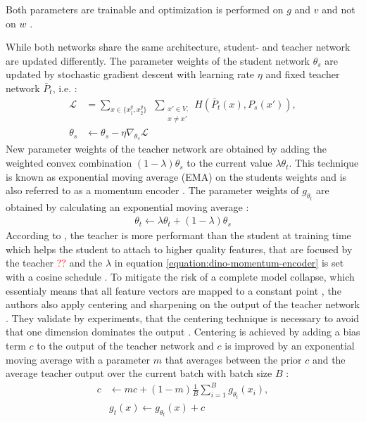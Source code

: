 Both parameters are trainable and optimization is performed on $g$ and $v$ and not on $w$ \citep{Salimans2016}.
\par
While both networks share the same architecture, student- and teacher network are updated differently. 
The parameter weights of the student network $\theta_s$ are updated by stochastic gradient descent with learning rate $\eta$ and fixed teacher network $\bar{P}_t$, i.e. \citep{Caron2021}:
\begin{align}
	\mathcal{L} &= \sum_{x \in \{x_1^g, x_2^g\}} \hspace{5pt} \sum_{\substack{ x\prime \in V, \\ x\neq x\prime}} H(\bar P_t(x),P_s(x\prime)), \\ 
	\theta_s &\leftarrow \theta_s - \eta \nabla_{\theta_s} \mathcal{L}
\end{align}
New parameter weights of the teacher network are obtained by adding the weighted convex combination $(1-\lambda)\theta_s$ to the current value $\lambda\theta_t$.
This technique is known as exponential moving average (EMA) on the students weights and is also referred to as a momentum encoder \citep{He2019,Caron2021}.
The parameter weights of $g_{\theta_t}$ are obtained by calculating an exponential moving average \citep{Grill2020,Caron2021}: 
\begin{align}
	\theta_t \leftarrow \lambda \theta_t + (1-\lambda) \theta_s
	\label{equation:dino-momentum-encoder}
\end{align}
According to \citep{Caron2021}, the teacher is more performant than the student at training time which helps the student to attach to higher quality features, that are focused by the teacher \textcolor{red}{??} and the $\lambda$ in equation \ref{equation:dino-momentum-encoder} is set with a cosine schedule \citep{Grill2020}.
To mitigate the risk of a complete model collapse, which essentialy means that all feature vectors are mapped to a constant point \citep{Jing2022}, the authors also apply centering and sharpening on the output of the teacher network \citep{Caron2021}.
They validate by experiments, that the centering technique is necessary to avoid that one dimension dominates the output \citep{Caron2021}.
Centering is achieved by adding a bias term $c$ to the output of the teacher network and $c$ is improved by an exponential moving average with a parameter $m$ that averages between the prior $c$ and the average teacher output over the current batch with batch size $B$ \citep{Caron2021}:
\begin{align}
	c & \leftarrow mc + (1-m) \frac{1}{B}\sum_{i=1}^B g_{\theta_t}(x_i), \\
	& g_t(x) \leftarrow g_{\theta_t}(x) + c
	\label{equation:dino-centering}
\end{align}
